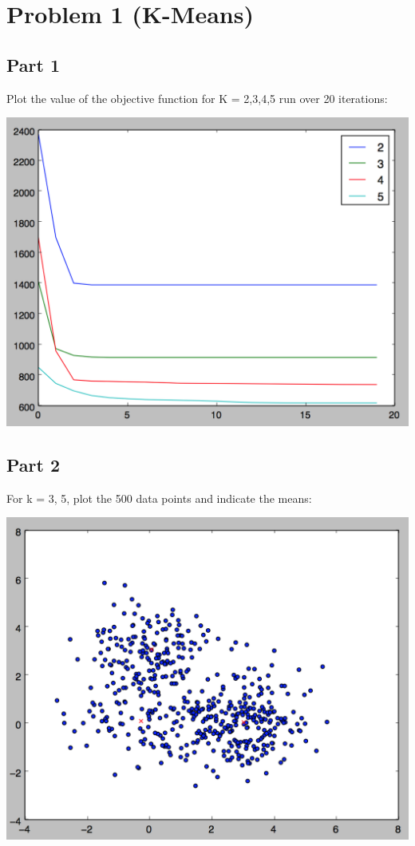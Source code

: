 \documentclass[11pt]{article}
\begin{document}

\section*{Problem 1 (K-Means)}

\subsection*{Part 1}

Plot the value of the objective function for K = 2,3,4,5 run over 20 iterations:
	
\includegraphics[scale=.8]{images/km_objective.png}

\subsection*{Part 2}

For k = 3, 5, plot the 500 data points and indicate the means:
		
\includegraphics[scale=.6]{images/k3}
\end{document}
